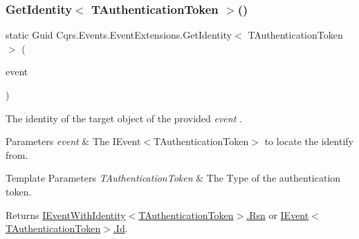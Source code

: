 \subsubsection{\texorpdfstring{Get\+Identity$<$ T\+Authentication\+Token $>$()}{GetIdentity< TAuthenticationToken >()}}
{\footnotesize\ttfamily static Guid Cqrs.\+Events.\+Event\+Extensions.\+Get\+Identity$<$ T\+Authentication\+Token $>$ (\begin{DoxyParamCaption}\item[{this \hyperlink{interfaceCqrs_1_1Events_1_1IEvent}{I\+Event}$<$ T\+Authentication\+Token $>$ @}]{event }\end{DoxyParamCaption})\hspace{0.3cm}{\ttfamily [static]}}



The identity of the target object of the provided {\itshape event} . 


\begin{DoxyParams}{Parameters}
{\em event} & The I\+Event$<$\+T\+Authentication\+Token$>$ to locate the identify from.\\
\hline
\end{DoxyParams}

\begin{DoxyTemplParams}{Template Parameters}
{\em T\+Authentication\+Token} & The Type of the authentication token.\\
\hline
\end{DoxyTemplParams}
\begin{DoxyReturn}{Returns}
\hyperlink{interfaceCqrs_1_1Events_1_1IEventWithIdentity_a4d87d8dd7304f4ce31ad8bcbf3f96789_a4d87d8dd7304f4ce31ad8bcbf3f96789}{I\+Event\+With\+Identity$<$\+T\+Authentication\+Token$>$.\+Rsn} or \hyperlink{interfaceCqrs_1_1Events_1_1IEvent_a2974e13d307c62c5cc438d668ff1783b_a2974e13d307c62c5cc438d668ff1783b}{I\+Event$<$\+T\+Authentication\+Token$>$.\+Id}.
\end{DoxyReturn}
